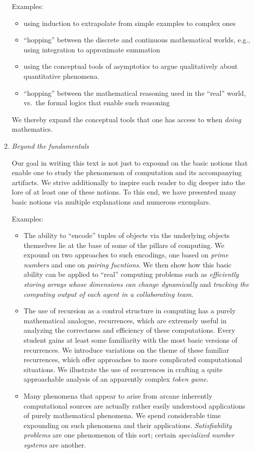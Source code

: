 \begin{enumerate}
\medskip

{\small\sf Examples:}
\begin{itemize}
\item
using induction to extrapolate from simple examples to complex ones
\item
``hopping'' between the discrete and continuous mathematical worlds,
e.g., using integration to approximate summation
\item
using the conceptual tools of asymptotics to argue qualitatively about
quantitative phenomena.
\item
``hopping'' between the mathematical reasoning used in the ``real''
  world, vs.~the formal logics that enable such reasoning
\end{itemize}
We thereby expand the conceptual tools that one has access to when
{\em doing} mathematics.

\medskip

\item
{\it Beyond the fundamentals}

Our goal in writing this text is not just to expound on the basic
notions that enable one to study the phenomenon of computation and its
accompanying artifacts.  We strive additionally to inspire each reader
to dig deeper into the lore of at least one of these notions. To this
end, we have presented many basic notions via multiple explanations
and numerous exemplars.

\medskip

{\small\sf Examples:}
\begin{itemize}
\item
The ability to ``encode'' tuples of objects via the underlying objects
themselves lie at the base of some of the pillars of computing.  We
expound on two approaches to such encodings, one based on {\em prime
  numbers} and one on {\em pairing fucntions}.  We then show how this
basic ability can be applied to ``real'' computing problems such as
{\em efficiently storing arrays whose dimensions can change
  dynamically} and {\em tracking the computing output of each agent in
  a collaborating team}.
\item
The use of recursion as a control structure in computing has a purely
mathematical analogue, recurrences, which are extremely useful in
analyzing the correctness and efficiency of these computations.  Every
student gains at least some familiarity with the most basic versions
of recurrences.  We introduce variations on the theme of these
familiar recurrences, which offer approaches to more complicated
computational situations.  We illustrate the use of recurrences in
crafting a quite approachable analysis of an apparently complex {\em
  token game}.
\item
Many phenomena that appear to arise from arcane inherently
computational sources are actually rather easily understood
applications of purely mathematical phenomena.  We spend considerable
time expounding on such phenomena and their applications.  {\em
  Satisfiability problems} are one phenomenon of this sort; certain
{\em specialized number systems} are another.
\end{itemize}
\end{enumerate}


